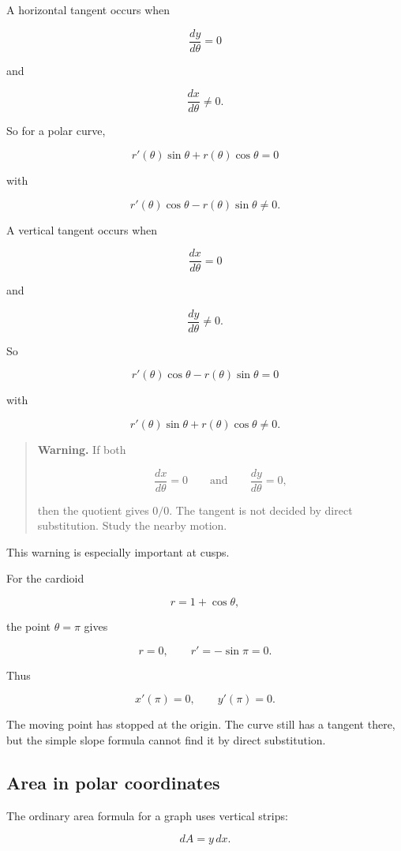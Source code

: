 A horizontal tangent occurs when

\[
\frac{dy}{d\theta}=0
\]

and

\[
\frac{dx}{d\theta}\neq0.
\]

So for a polar curve,

\[
\boxed{
r'(\theta)\sin\theta+r(\theta)\cos\theta=0
}
\]

with

\[
r'(\theta)\cos\theta-r(\theta)\sin\theta\neq0.
\]

A vertical tangent occurs when

\[
\frac{dx}{d\theta}=0
\]

and

\[
\frac{dy}{d\theta}\neq0.
\]

So

\[
\boxed{
r'(\theta)\cos\theta-r(\theta)\sin\theta=0
}
\]

with

\[
r'(\theta)\sin\theta+r(\theta)\cos\theta\neq0.
\]

\begin{quote}
\textbf{Warning.}
If both

\[
\frac{dx}{d\theta}=0
\qquad\text{and}\qquad
\frac{dy}{d\theta}=0,
\]

then the quotient gives \(0/0\).  The tangent is not decided by direct substitution.
Study the nearby motion.
\end{quote}

This warning is especially important at cusps.

For the cardioid

\[
r=1+\cos\theta,
\]

the point \(\theta=\pi\) gives

\[
r=0,
\qquad
r'=-\sin\pi=0.
\]

Thus

\[
x'(\pi)=0,
\qquad
y'(\pi)=0.
\]

The moving point has stopped at the origin.  The curve still has a tangent there, but the
simple slope formula cannot find it by direct substitution.

\subsection{Area in polar coordinates}
\label{subsec:area-polar-coordinates}

The ordinary area formula for a graph uses vertical strips:

\[
dA=y\,dx.
\]

